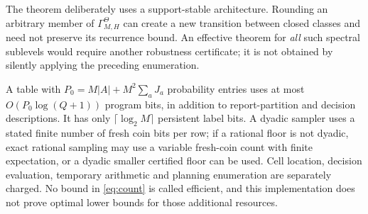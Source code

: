 The theorem deliberately uses a support-stable architecture. Rounding an arbitrary member of $\Gamma_{M,H}^\Theta$ can create a new transition between closed classes and need not preserve its recurrence bound. An effective theorem for \emph{all} such spectral sublevels would require another robustness certificate; it is not obtained by silently applying the preceding enumeration.

A table with $P_0=M|A|+M^2\sum_aJ_a$ probability entries uses at most $O(P_0\log(Q+1))$ program bits, in addition to report-partition and decision descriptions. It has only $\lceil\log_2M\rceil$ persistent label bits. A dyadic sampler uses a stated finite number of fresh coin bits per row; if a rational floor is not dyadic, exact rational sampling may use a variable fresh-coin count with finite expectation, or a dyadic smaller certified floor can be used. Cell location, decision evaluation, temporary arithmetic and planning enumeration are separately charged. No bound in \eqref{eq:count} is called efficient, and this implementation does not prove optimal lower bounds for those additional resources.
